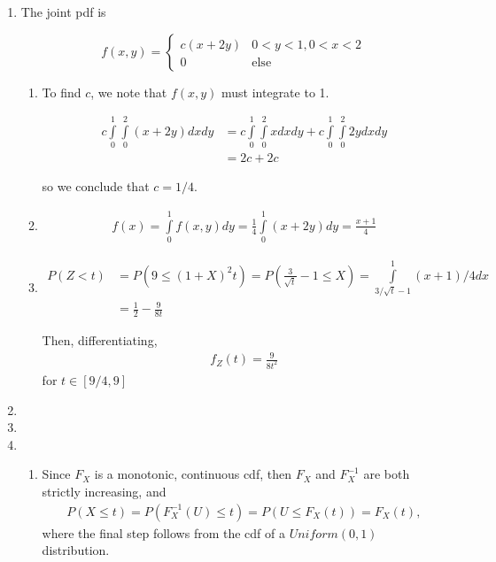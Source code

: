 \documentclass[12pt]{article}
\begin{document}
\begin{enumerate}
\item The joint pdf is

$$f(x,y) = \begin{cases} 
c(x + 2y) & 0 < y < 1, 0 < x < 2 \\
0 & \text{else}
\end{cases}$$

\begin{enumerate}

\item To find $c$, we note that $f(x,y)$ must integrate to 1.

\begin{align*}
c \int \limits_0^1 \int \limits_0^2 (x + 2y) dx dy &= c \int \limits_0^1 \int \limits_0^2 x dx dy + c \int \limits_0^1 \int \limits_0^2 2y dx dy \\
&= 2c + 2c
\end{align*}

so we conclude that $c= 1/4$.

\item 

\begin{align*}
f(x) = \int \limits_0^1 f(x,y) dy = \frac{1}{4} \int \limits_0^1 (x + 2y) dy = \frac{x + 1}{4}
\end{align*}

\item 

\begin{align*}
P(Z < t) &= P(9 \leq (1 + X)^2t) = P(\frac{3}{\sqrt{t}} - 1 \leq X) = \int \limits_{3/\sqrt{t} - 1}^1 (x + 1)/4 dx \\
&= \frac{1}{2} - \frac{9}{8t}
\end{align*}

Then, differentiating,
\begin{align*}
f_Z(t) = \frac{9}{8 t^2}
\end{align*}
for $t \in [9/4, 9]$

\end{enumerate}

\item 

\item 

\item 

\begin{enumerate}
\item Since $F_X$ is a monotonic, continuous cdf, then $F_X$ and $F_X^{-1}$ are both strictly increasing, and
\begin{align*}
P(X \leq t) = P(F_X^{-1}(U) \leq t) = P(U \leq F_X(t)) = F_X(t),
\end{align*}
where the final step follows from the cdf of a $Uniform(0,1)$ distribution.


\end{enumerate}
\end{enumerate}
\end{document}
